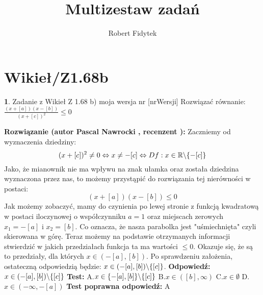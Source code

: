 \documentclass[12pt, a4paper]{article}
\title{Multizestaw zadań}
\author{Robert Fidytek}
\date{}
\theoremstyle{definition} %
\newtheorem{zad}{}
\newcommand{\kategoria}[1]{\section{#1}} %
\newcommand{\zadStart}[1]{\begin{zad}#1\newline} %
\newcommand{\zadStop}{\end{zad}}   %
\newcommand{\rozwStart}[2]{\noindent \textbf{Rozwiązanie (autor #1 , recenzent #2): }\newline} %
\newcommand{\odpStart}{\noindent \textbf{Odpowiedź:}\newline}    %
\newcommand{\odpStop}{\newline}                                             %
\newcommand{\testStart}{\noindent \textbf{Test:}\newline} %
\newcommand{\testStop}{\newline} %
\newcommand{\kluczStart}{\noindent \textbf{Test poprawna odpowiedź:}\newline} %
\newcommand{\kluczStop}{\newline} %
\begin{document}
\maketitle


\kategoria{Wikieł/Z1.68b}
\zadStart{Zadanie z Wikieł Z 1.68 b) moja wersja nr [nrWersji]}
Rozwiązać równanie: $\frac{(x+[a])(x-[b])}{(x+[c])^2}\leq0$
\zadStop
\rozwStart{Pascal Nawrocki}{}
Zaczniemy od wyznaczenia dziedziny:
$$(x+[c])^2\neq0\Leftrightarrow x\neq-[c] \Leftrightarrow Df:x\in\mathbb{R}\symbol{92}\{-[c]\}$$
Jako, że mianownik nie ma wpływu na znak ułamka oraz została dziedzina wyznaczona przez nas, to możemy przystąpić do rozwiązania tej nierówności w postaci:
$$(x+[a])(x-[b])\leq0$$
Jak możemy zobaczyć, mamy do czynienia po lewej stronie z funkcją kwadratową w postaci iloczynowej o współczynniku $a=1$ oraz miejscach zerowych $x_1=-[a]$ i $x_2=[b]$. 
Co oznacza, że nasza parabolka jest "uśmiechnięta" czyli skierowana w górę. Teraz możemy na podstawie otrzymanych informacji stwierdzić w jakich przedziałach funkcja ta ma wartości $\leq0$. Okazuje się, że są to przedziały, dla których $x\in(-[a],[b])$. Po sprawdzeniu założenia, ostateczną odpowiedzią będzie:  $x\in(-[a],[b])\symbol{92}\{[c]\}$.
\odpStart
$x\in(-[a],[b])\symbol{92}\{[c]\}$
\odpStop
\testStart
A.$x\in\{-[a],[b]\}\symbol{92}\{[c]\}$
B.$x\in([b],\infty)$
C.$x\in\emptyset$
D.$x\in(-\infty,-[a])$
\testStop
\kluczStart
A
\kluczStop
\end{document}
